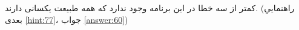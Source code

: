 \section{}
\paragraph{}\label{hint:226}
کمتر از سه خطا در این برنامه وجود ندارد که همه طبیعت یکسانی دارند. (راهنماییِ بعدی \ref{hint:77}، جواب \ref{answer:60})